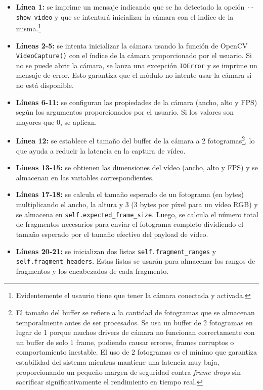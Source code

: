 \begin{itemize}
    \item \textbf{Línea 1:} se imprime un mensaje indicando que se ha detectado la opción \verb|--show_video| y que se intentará inicializar la cámara con el indice de la misma.\footnote{Evidentemente el usaurio tiene que tener la cámara conectada y activada.}
    \item \textbf{Líneas 2-5:} se intenta inicializar la cámara usando la función de OpenCV \texttt{VideoCapture()} con el índice de la cámara proporcionado por el usuario. Si no se puede abrir la cámara, se lanza una excepción \texttt{IOError} y se imprime un mensaje de error. Esto garantiza que el módulo no intente usar la cámara si no está disponible.
    \item \textbf{Líneas 6-11:} se configuran las propiedades de la cámara (ancho, alto y FPS) según los argumentos proporcionados por el usuario. Si los valores son mayores que 0, se aplican.
    \item \textbf{Línea 12:} se establece el tamaño del buffer de la cámara a 2 fotogramas\footnote{El tamaño del buffer se refiere a la cantidad de fotogramas que se almacenan temporalmente antes de ser procesados. Se usa un buffer de 2 fotogramas en lugar de 1 porque muchos drivers de cámara no funcionan correctamente con un buffer de solo 1 frame, pudiendo causar errores, frames corruptos o comportamiento inestable. El uso de 2 fotogramas es el mínimo que garantiza estabilidad del sistema mientras mantiene una latencia muy baja, proporcionando un pequeño margen de seguridad contra \textit{frame drops} sin sacrificar significativamente el rendimiento en tiempo real.}, lo que ayuda a reducir la latencia en la captura de vídeo.
    \item \textbf{Líneas 13-15:} se obtienen las dimensiones del vídeo (ancho, alto y FPS) y se almacenan en las variables correspondientes.
    \item \textbf{Líneas 17-18:} se calcula el tamaño esperado de un fotograma (en bytes) multiplicando el ancho, la altura y 3 (3 bytes por píxel para un vídeo RGB) y se almacena en \texttt{self.expected\_frame\_size}. Luego, se calcula el número total de fragmentos necesarios para enviar el fotograma completo dividiendo el tamaño esperado por el tamaño efectivo del payload de vídeo.
    \item \textbf{Líneas 20-21:} se inicializan dos listas \texttt{self.fragment\_ranges} y \texttt{self.fragment\_headers}. Estas listas se usarán para almacenar los rangos de fragmentos y los encabezados de cada fragmento.

\end{itemize}
